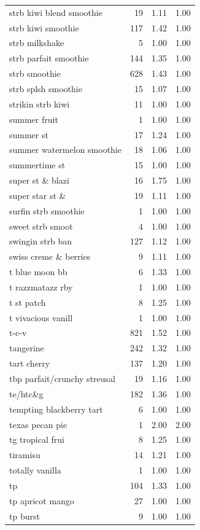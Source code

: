 \begin{table}
\begin{tabular}{lrrr}
strb kiwi blend smoothie & 19 & 1.11 & 1.00 \\
strb kiwi smoothie & 117 & 1.42 & 1.00 \\
strb milkshake & 5 & 1.00 & 1.00 \\
strb parfait smoothie & 144 & 1.35 & 1.00 \\
strb smoothie & 628 & 1.43 & 1.00 \\
strb splsh smoothie & 15 & 1.07 & 1.00 \\
strikin strb kiwi & 11 & 1.00 & 1.00 \\
summer fruit & 1 & 1.00 & 1.00 \\
summer st & 17 & 1.24 & 1.00 \\
summer watermelon smoothie & 18 & 1.06 & 1.00 \\
summertime st & 15 & 1.00 & 1.00 \\
super st \& blazi & 16 & 1.75 & 1.00 \\
super star st \& & 19 & 1.11 & 1.00 \\
surfin strb smoothie & 1 & 1.00 & 1.00 \\
sweet strb smoot & 4 & 1.00 & 1.00 \\
swingin strb ban & 127 & 1.12 & 1.00 \\
swiss creme \& berries & 9 & 1.11 & 1.00 \\
t blue moon bb & 6 & 1.33 & 1.00 \\
t razzmatazz rby & 1 & 1.00 & 1.00 \\
t st patch & 8 & 1.25 & 1.00 \\
t vivacious vanill & 1 & 1.00 & 1.00 \\
t-c-v & 821 & 1.52 & 1.00 \\
tangerine & 242 & 1.32 & 1.00 \\
tart cherry & 137 & 1.20 & 1.00 \\
tbp parfait/crunchy streusal & 19 & 1.16 & 1.00 \\
te/htc\&g & 182 & 1.36 & 1.00 \\
tempting blackberry tart & 6 & 1.00 & 1.00 \\
texas pecan pie & 1 & 2.00 & 2.00 \\
tg tropical frui & 8 & 1.25 & 1.00 \\
tiramisu & 14 & 1.21 & 1.00 \\
totally vanilla & 1 & 1.00 & 1.00 \\
tp & 104 & 1.33 & 1.00 \\
tp apricot mango & 27 & 1.00 & 1.00 \\
tp burst & 9 & 1.00 & 1.00 \\

\end{tabular}
\end{table}
